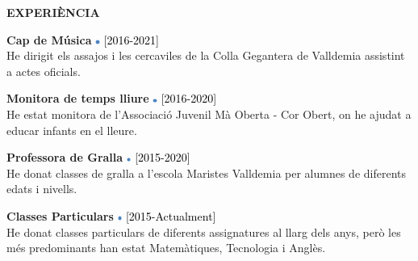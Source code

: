 \documentclass[../main.tex]{subfiles}
\begin{document}
    \vspace*{0.5cm}
    \textbf{\textcolor{myCV2}{EXPERIÈNCIA\underline{\hspace{7.1cm}}}}
        \vspace*{0.3cm}
        
        \textbf{Cap de Música}
        \includegraphics[width=0.15cm]{assets/full.png} 
        \textcolor{black}{[2016-2021]}\\
        He dirigit els assajos i les cercaviles de la Colla Gegantera de Valldemia assistint a actes oficials.
        

        \vspace*{0.25cm}
        \textbf{Monitora de temps lliure}
        \includegraphics[width=0.15cm]{assets/full.png}
        \textcolor{black}{[2016-2020]}\\
        He estat monitora de l'Associació Juvenil Mà Oberta - Cor Obert, on he ajudat a educar infants en el lleure.
        
        \vspace*{0.25cm}
        \textbf{Professora de Gralla}
        \includegraphics[width=0.15cm]{assets/full.png}
        \textcolor{black}{[2015-2020]} \\
        He donat classes de gralla a l'escola Maristes Valldemia per alumnes de diferents edats i nivells.
        
            
        
        \vspace*{0.25cm}
        \textbf{Classes Particulars}
        \includegraphics[width=0.15cm]{assets/full.png}
        \textcolor{black}{[2015-Actualment]} \\
        He donat classes particulars de diferents assignatures al llarg dels anys, però les més predominants han estat Matemàtiques, Tecnologia i Anglès.
\end{document}
